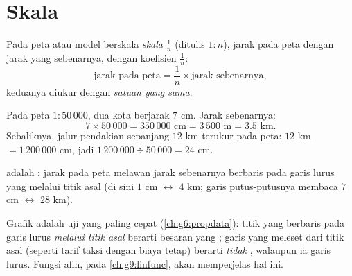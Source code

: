 \section{Skala}

\begin{definition}[Skala]\label{def:g7:prop:scale}
Pada peta atau model berskala \emph{skala}
$\frac{1}{n}$ (ditulis $1 : n$), jarak pada peta  dengan
jarak yang sebenarnya, dengan koefisien $\frac1n$:
\[
\text{jarak pada peta} = \frac{1}{n} \times \text{jarak sebenarnya},
\]
keduanya diukur dengan \emph{satuan yang sama}.
\end{definition}

\begin{example}\label{ex:g7:prop:scale}
Pada peta $1 : 50\,000$, dua kota berjarak $7$ cm. Jarak sebenarnya:
\[
7 \times 50\,000 = 350\,000 \text{ cm} = 3\,500 \text{ m} = 3.5
\text{ km}.
\]
Sebaliknya, jalur pendakian sepanjang $12$ km terukur pada peta:
$12$ km $= 1\,200\,000$ cm, jadi $1\,200\,000 \div 50\,000 = 24$ cm.
\end{example}

\begin{omfigure}

{\small {} adalah : jarak pada peta melawan
jarak sebenarnya berbaris pada garis lurus yang melalui titik asal (di
sini $1$ cm $\leftrightarrow$ $4$ km; garis putus-putusnya membaca
$7$ cm $\leftrightarrow$ $28$ km).}
\end{omfigure}

\begin{remark}
Grafik adalah uji  yang paling cepat
(\cref{ch:g6:propdata}): titik yang berbaris pada garis lurus
\emph{melalui titik asal} berarti besaran yang ; garis yang
meleset dari titik asal (seperti tarif taksi dengan biaya tetap)
berarti \emph{tidak} , walaupun ia garis lurus. Fungsi afin,
pada \cref{ch:g9:linfunc}, akan memperjelas hal ini.
\end{remark}

